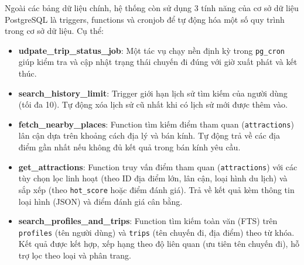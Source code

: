 Ngoài các bảng dữ liệu chính, hệ thống còn sử dụng 3 tính năng của cơ sở dữ liệu PostgreSQL là triggers, functions và cronjob để tự động hóa một số quy trình trong cơ sở dữ liệu. Cụ thể:
\begin{itemize}
    \item \textbf{udpate\_trip\_status\_job}: Một tác vụ chạy nền định kỳ trong \texttt{pg\_cron} giúp kiểm tra và cập nhật trạng thái chuyến đi đúng với giờ xuất phát và kết thúc.
    
    \item \textbf{search\_history\_limit}: Trigger giới hạn lịch sử tìm kiếm của người dùng (tối đa 10). Tự động xóa lịch sử cũ nhất khi có lịch sử mới được thêm vào.
    \item \textbf{fetch\_nearby\_places}: Function tìm kiếm điểm tham quan (\texttt{attractions}) lân cận dựa trên khoảng cách địa lý và bán kính. Tự động trả về các địa điểm gần nhất nếu không đủ kết quả trong bán kính yêu cầu.
    \item \textbf{get\_attractions}: Function truy vấn điểm tham quan (\texttt{attractions}) với các tùy chọn lọc linh hoạt (theo ID địa điểm lớn, lân cận, loại hình du lịch) và sắp xếp (theo \texttt{hot\_score} hoặc điểm đánh giá). Trả về kết quả kèm thông tin loại hình (JSON) và điểm đánh giá cân bằng.
    
    \item \textbf{search\_profiles\_and\_trips}: Function tìm kiếm toàn văn (FTS) trên \texttt{profiles} (tên người dùng) và \texttt{trips} (tên chuyến đi, địa điểm) theo từ khóa. Kết quả được kết hợp, xếp hạng theo độ liên quan (ưu tiên tên chuyến đi), hỗ trợ lọc theo loại và phân trang.
\end{itemize}

